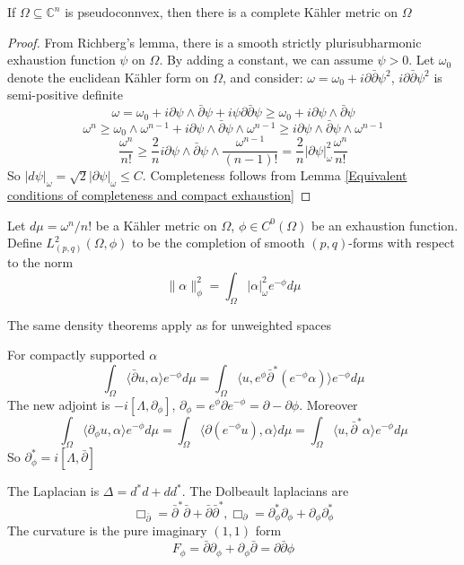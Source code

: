 \documentclass[../main.tex]{subfiles}
\begin{document}
\begin{theorem}
If $\Omega\subseteq\mathbb C^n$ is pseudoconnvex, then there is a complete K\"ahler metric on $\Omega$
\end{theorem}

\begin{proof}
From Richberg's lemma, there is a smooth strictly plurisubharmonic exhaustion function $\psi$ on $\Omega$. By adding a constant, we can assume $\psi>0$. Let $\omega_0$ denote the euclidean K\"ahler form on $\Omega$, and consider: $\omega=\omega_0+i\partial\bar\partial\psi^2$, $i\partial\bar\partial\psi^2$ is semi-positive definite
\[\omega=\omega_0+i\partial\psi\wedge\bar\partial\psi+i\psi\partial\bar\partial\psi\geq\omega_0+i\partial\psi\wedge\bar\partial\psi\]
\[\omega^n\geq\omega_0\wedge\omega^{n-1}+i\partial\psi\wedge\bar\partial\psi\wedge\omega^{n-1}\geq i\partial\psi\wedge\bar\partial\psi\wedge\omega^{n-1}\]
\[\frac{\omega^n}{n!}\geq\frac{2}{n}i\partial\psi\wedge\bar\partial\psi\wedge\frac{\omega^{n-1}}{(n-1)!}=\frac{2}{n}|\partial\psi|^2_\omega\frac{\omega^n}{n!}\]
So $|d\psi|_\omega=\sqrt{2}|\partial\psi|_\omega\leq C$. Completeness follows from Lemma \ref{Equivalent conditions of completeness and compact exhaustion}
\end{proof}

\begin{definition}
Let $d\mu=\omega^n/n!$ be a K\"ahler metric on $\Omega$, $\phi\in C^0(\Omega)$ be an exhaustion function. Define $L_{(p,q)}^2(\Omega,\phi)$ to be the completion of smooth $(p,q)$-forms with respect to the norm
\[\|\alpha\|^2_\phi=\int_\Omega|\alpha|_\omega^2e^{-\phi}d\mu\]
\end{definition}

The same density theorems apply as for unweighted spaces

For compactly supported $\alpha$
\[\int_\Omega\langle\bar\partial u,\alpha\rangle e^{-\phi}d\mu=\int_\Omega\langle u,e^\phi\bar\partial^*(e^{-\phi}\alpha)\rangle e^{-\phi}d\mu\]
The new adjoint is $-i[\Lambda,\partial_\phi]$, $\partial_\phi=e^\phi\partial e^{-\phi}=\partial-\partial\phi$. Moreover
\[\int_\Omega\langle\partial_\phi u,\alpha\rangle e^{-\phi}d\mu=\int_\Omega\langle\partial(e^{-\phi} u),\alpha\rangle d\mu=\int_\Omega\langle u,\bar\partial^*\alpha\rangle e^{-\phi}d\mu\]
So $\partial^*_\phi=i[\Lambda,\bar\partial]$

\begin{definition}
The Laplacian is $\Delta=d^*d+dd^*$. The Dolbeault laplacians are
\[\Box_{\bar\partial}=\bar\partial^*\bar\partial+\bar\partial\bar\partial^*,\Box_{\partial}=\partial_\phi^*\partial_\phi+\partial_\phi\partial_\phi^*\]
The curvature is the pure imaginary $(1,1)$ form
\[F_\phi=\bar\partial\partial_\phi+\partial_\phi\bar\partial=\partial\bar\partial\phi\]
\end{definition}
\end{document}
